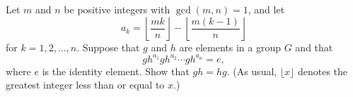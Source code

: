 Let $m$ and $n$ be positive integers with $\gcd(m,n) = 1$, and let
\[
a_k = \left\lfloor \frac{mk}{n} \right\rfloor - \left\lfloor \frac{m(k-1)}{n} \right\rfloor
\]
for $k=1,2,\dots,n$.
Suppose that $g$ and $h$ are elements in a group $G$ and that 
\[
gh^{a_1} gh^{a_2} \cdots gh^{a_n} = e,
\]
where $e$ is the identity element. Show that $gh= hg$. (As usual, $\lfloor x \rfloor$ denotes the greatest integer
less than or equal to $x$.)
